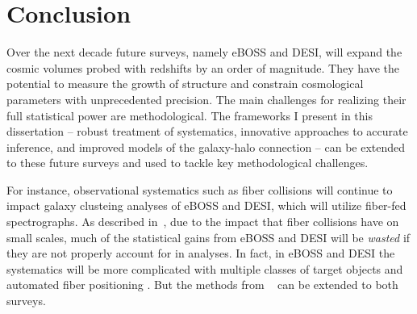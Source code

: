 \chapter*{Conclusion}







Over the next decade future surveys, namely eBOSS and DESI, will expand the 
cosmic volumes probed with redshifts by an order of magnitude. They have the 
potential to measure the growth of structure and constrain cosmological 
parameters with unprecedented precision. The main challenges for realizing 
their full statistical power are methodological. The frameworks I present
in this dissertation -- robust treatment of systematics, innovative approaches 
to accurate inference, and improved models of the galaxy-halo connection -- can be 
extended to these future surveys and used to tackle key methodological 
challenges. 

For instance, observational systematics such as fiber collisions will continue 
to impact galaxy clusteing analyses of eBOSS and DESI, which will utilize 
fiber-fed spectrographs. As described in~, due to the impact that fiber 
collisions have on small scales, much of the statistical gains from eBOSS and 
DESI will be {\em wasted} if they are not properly account for in analyses. 
In fact, in eBOSS and DESI the systematics will be more complicated with multiple 
classes of target objects and automated fiber positioning 
\citep{Cahn:2015_desifib, Dawson:2015aa}. But the methods from ~ 
can be extended to both surveys.

